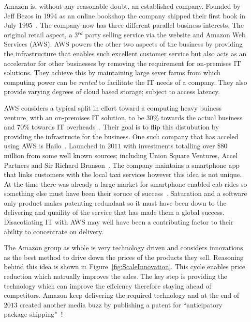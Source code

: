 {}

Amazon is, without any reasonable doubt, an established company.
Founded by Jeff Bezos in 1994 as an online bookshop the company shipped their first book in July 1995~\cite{seattle}.
The company now has three different parallel business interests.
The original retail aspect, a 3$^{rd}$ party selling service via the website and Amazon Web Services (AWS).
AWS powers the other two aspects of the business by providing the infrastructure that enables such excellent customer service but also acts as an accelerator for other businesses by removing the requirement for on-premises IT solutions.
They achieve this by maintaining large sever farms from which computing power can be \emph{rented} to facilitate the IT needs of a company.
They also provide varying degrees of cloud based storage; subject to access latency.

AWS considers a typical split in effort toward a computing heavy buiness venture, with an on-premises IT solution, to be $30$\% towards the actual business and $70$\% towards IT overheads~\cite{gavin2014ams}. 
Their goal is to flip this distubution by providing the infrastructe for the business. 
One such company that has acceled using AWS is Hailo~\cite{gavin2014ams}.
Launched in $2011$ with investments totalling over \$$80$ million from some well known sources; including Union Square Ventures, Accel Partners and Sir Richard Branson~\cite{hailo}.
The company maintains a smartphone app that links customers with the local taxi services however this idea is not unique.
At the time there was already a large market for smartphone enabled cab rides so something else must have been their soruce of success~\cite{ventureBeat}.
Saturation and a software only product makes patenting redundant so it must have been down to the delivering and quaility of the service that has made them a global success.
Disacotiating IT with AWS may well have been a contributing factor to their ability to concentrate on delivery.


The Amazon group as whole is very technology driven and considers innovations as the best method to drive down the prices of the products they sell.
Reasoning behind this idea is shown in Figure~\ref{fig:ScaleInnovation}.
This cycle enables price reduction which natrually improves the sales.
The key step is providing the technology which can improve the effciency therefore staying ahead of competitors.
Amazon keep delivering the required technology and at the end of $2013$ created another media buzz by publishing a patent for ``anticipatory package shipping''~\cite{spiegel2013method}! 

